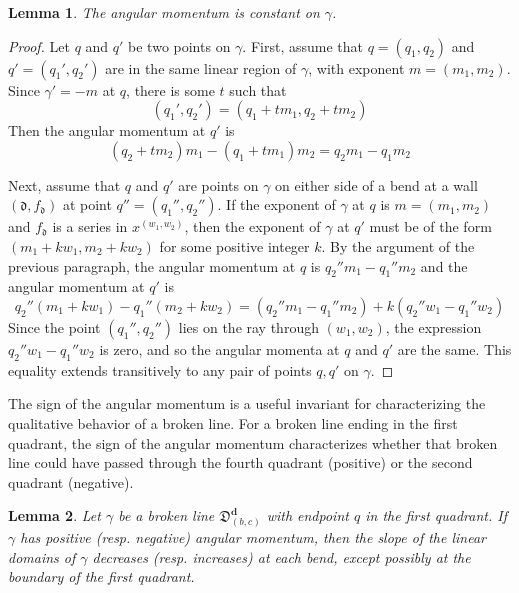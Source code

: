 \documentclass[11pt]{amsart}
\newtheorem{lemma}{Lemma}[section]
\theoremstyle{remark}
\numberwithin{equation}{section}
\newcommand{\fd}{\mathfrak{d}}
\begin{document}
\begin{lemma}
The angular momentum is constant on $\gamma$.
\end{lemma}
\begin{proof}
Let $q$ and $q'$ be two points on $\gamma$.
First, assume that $q=(q_1,q_2)$ and $q'=(q_1',q_2')$ are in the same linear region of $\gamma$, with exponent $m=(m_1,m_2)$.  Since $\gamma'=-m$ at $q$, there is some $t$ such that 
\[ (q_1',q_2') = (q_1+tm_1,q_2+tm_2) \]
Then the angular momentum at $q'$ is 
\[ (q_2+tm_2)m_1-(q_1+tm_1)m_2 = q_2m_1 - q_1m_2 \]

Next, assume that $q$ and $q'$ are points on $\gamma$ on either side of a bend at a wall $(\fd, f_{\fd})$ at point $q''=(q_1'',q_2'')$.  If the exponent of $\gamma$ at $q$ is $m=(m_1,m_2)$ and $f_{\fd}$ is a series in $x^{(w_1,w_2)}$, then the exponent of $\gamma$ at $q'$ must be of the form $(m_1+kw_1,m_2+kw_2)$ for some positive integer $k$.  By the argument of the previous paragraph, the angular momentum at $q$ is $q_2''m_1-q_1''m_2$
and the angular momentum at $q'$ is
\[ q_2''(m_1+kw_1)-q_1''(m_2+kw_2) = (q_2''m_1-q_1''m_2)+k(q_2''w_1-q_1''w_2) \]
Since the point $(q_1'',q_2'')$ lies on the ray through $(w_1,w_2)$, the expression $q_2''w_1-q_1''w_2$ is zero, and so the angular momenta at $q$ and $q'$ are the same.  This equality extends transitively to any pair of points $q,q'$ on $\gamma$.
\end{proof}
The sign of the angular momentum is a useful invariant for characterizing the qualitative behavior of a broken line.
For a broken line ending in the first quadrant, the sign of the angular momentum characterizes whether that broken line could have passed through the fourth quadrant (positive) or the second quadrant (negative).

\begin{lemma}
Let $\gamma$ be a broken line $\mathfrak{D}_{(b,c)}^{\mathbf{d}}$ with endpoint $q$ in the first quadrant. If $\gamma$ has positive (resp. negative) angular momentum, then the slope of the linear domains of $\gamma$ decreases (resp. increases) at each bend, except possibly at the boundary of the first quadrant. 
\end{lemma}
\end{document}
